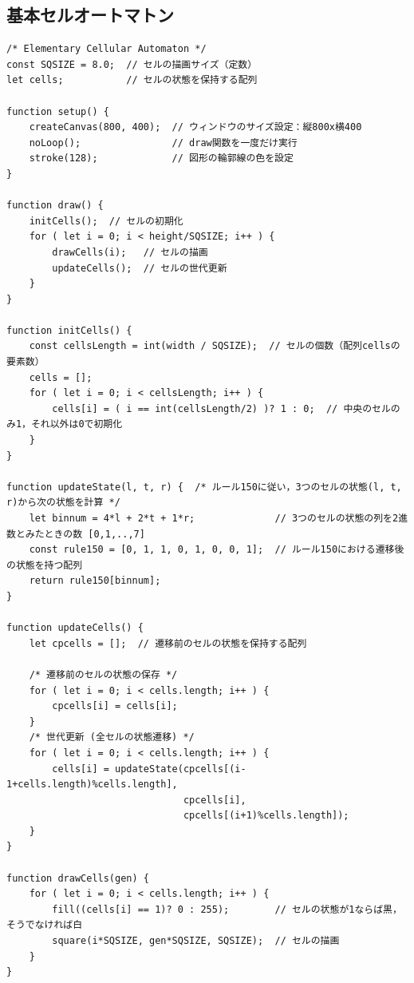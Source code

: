 \documentclass[dvipdfmx]{jsarticle}
\theoremstyle{definition}
\begin{document}
\subsection{基本セルオートマトン}  \label{subsec_code_ECA}
\begin{lstlisting}[caption=基本セルオートマトン（ルール150）, label=code_ECA_all]
/* Elementary Cellular Automaton */
const SQSIZE = 8.0;  // セルの描画サイズ（定数）
let cells;           // セルの状態を保持する配列

function setup() {
    createCanvas(800, 400);  // ウィンドウのサイズ設定：縦800x横400
    noLoop();                // draw関数を一度だけ実行
    stroke(128);             // 図形の輪郭線の色を設定
}

function draw() {
    initCells();  // セルの初期化
    for ( let i = 0; i < height/SQSIZE; i++ ) {
        drawCells(i);   // セルの描画
        updateCells();  // セルの世代更新
    }
}

function initCells() {
    const cellsLength = int(width / SQSIZE);  // セルの個数（配列cellsの要素数）
    cells = [];
    for ( let i = 0; i < cellsLength; i++ ) {
        cells[i] = ( i == int(cellsLength/2) )? 1 : 0;  // 中央のセルのみ1，それ以外は0で初期化
    }
}

function updateState(l, t, r) {  /* ルール150に従い，3つのセルの状態(l, t, r)から次の状態を計算 */
    let binnum = 4*l + 2*t + 1*r;              // 3つのセルの状態の列を2進数とみたときの数 [0,1,..,7]
    const rule150 = [0, 1, 1, 0, 1, 0, 0, 1];  // ルール150における遷移後の状態を持つ配列
    return rule150[binnum];
}

function updateCells() {
    let cpcells = [];  // 遷移前のセルの状態を保持する配列

    /* 遷移前のセルの状態の保存 */
    for ( let i = 0; i < cells.length; i++ ) {
        cpcells[i] = cells[i];
    }
    /* 世代更新 (全セルの状態遷移) */
    for ( let i = 0; i < cells.length; i++ ) {
        cells[i] = updateState(cpcells[(i-1+cells.length)%cells.length],
                               cpcells[i],
                               cpcells[(i+1)%cells.length]);
    }
}

function drawCells(gen) {
    for ( let i = 0; i < cells.length; i++ ) {
        fill((cells[i] == 1)? 0 : 255);        // セルの状態が1ならば黒，そうでなければ白
        square(i*SQSIZE, gen*SQSIZE, SQSIZE);  // セルの描画
    }
}
\end{lstlisting}
\clearpage
\end{document}
